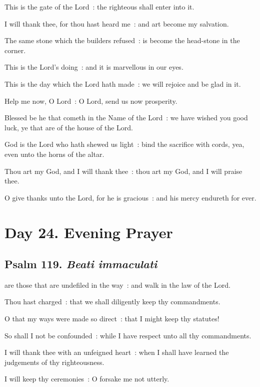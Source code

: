 This is the gate of the Lord~: the righteous shall enter into it.\par
{}I will thank thee, for thou hast heard me~: and art become my salvation.\par
{}The same stone which the builders refused~: is become the head-stone in the corner.\par
{}This is the Lord's doing~: and it is marvellous in our eyes.\par
{}This is the day which the Lord hath made~: we will rejoice and be glad in it.\par
{}Help me now, O Lord~: O Lord, send us now prosperity.\par
{}Blessed be he that cometh in the Name of the Lord~: we have wished you good luck, ye that are of the house of the Lord.\par
{}God is the Lord who hath shewed us light~: bind the sacrifice with cords, yea, even unto the horns of the altar.\par
{}Thou art my God, and I will thank thee~: thou art my God, and I will praise thee.\par
{}O give thanks unto the Lord, for he is gracious~: and his mercy endureth for ever.\par

\section*{Day 24. Evening Prayer}

\subsection{Psalm 119. \textit{Beati immaculati}}

 are those that are undefiled in the way~: and walk in the law of the Lord.\par
{}
Thou hast charged~: that we shall diligently keep thy commandments.\par
{}O that my ways were made so direct~: that I might keep thy statutes!\par
{}So shall I not be confounded~: while I have respect unto all thy commandments.\par
{}I will thank thee with an unfeigned heart~: when I shall have learned the judgements of thy righteousness.\par
{}I will keep thy ceremonies~: O forsake me not utterly.\par

